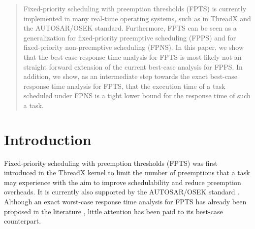 \documentclass[conference,compsoc]{IEEEtran}
\begin{document}




\maketitle

\begin{abstract}
Fixed-priority scheduling with preemption thresholds (FPTS) is currently implemented in many real-time operating systems, such as in ThreadX and the AUTOSAR/OSEK standard. Furthermore, FPTS can be seen as a generalization for fixed-priority preemptive scheduling (FPPS) and for fixed-priority non-preemptive scheduling (FPNS). In this paper, we show that the best-case response time analysis for FPTS is most likely not an straight forward extension of the current best-case analysis for FPPS. In addition, we show, as an intermediate step towards the exact best-case response time analysis for FPTS, that the execution time of a task scheduled under FPNS is a tight lower bound for the response time of such a task.
\end{abstract}





%
\IEEEpeerreviewmaketitle



\section{Introduction}
Fixed-priority scheduling with preemption thresholds (FPTS)  was first introduced in the ThreadX kernel \cite{TX} to limit the number of preemptions that a task may experience with the aim to improve schedulability and reduce preemption overheads. It is currently also supported by the AUTOSAR/OSEK standard \cite{B11}. Although an exact worst-case response time analysis for FPTS has already been proposed in the literature \cite{KRL05}, little attention has been paid to its best-case counterpart.
\end{document}
